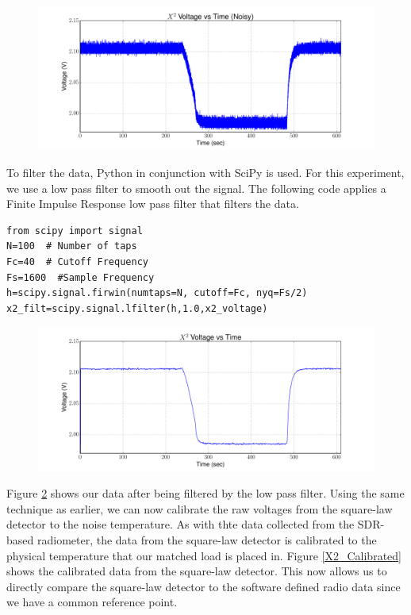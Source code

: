 \begin{figure}[h!tb] \centering
\includegraphics[width=\textwidth]{Experiments/Exp1/noisy_voltage.pdf}
\label{X2_Raw}
\end{figure}

To filter the data, Python in conjunction with SciPy is used.  For this experiment, we use a low pass filter to smooth out the signal.  The following code applies a Finite Impulse Response low pass filter that filters the data.

\begin{lstlisting}[frame=single,keywordstyle=\color{blue}]
from scipy import signal
N=100  # Number of taps
Fc=40  # Cutoff Frequency
Fs=1600  #Sample Frequency
h=scipy.signal.firwin(numtaps=N, cutoff=Fc, nyq=Fs/2)
x2_filt=scipy.signal.lfilter(h,1.0,x2_voltage)
\end{lstlisting}

\begin{figure}[h!tb] \centering
\includegraphics[width=\textwidth]{Experiments/Exp1/x2_filter.pdf}
\label{X2_filter}
\end{figure}

Figure \ref{X2_filter} shows our data after being filtered by the low pass filter.  Using the same technique as earlier, we can now calibrate the raw voltages from the square-law detector to the noise temperature.  As with thte data collected from the SDR-based radiometer, the data from the square-law detector is calibrated to the physical temperature that our matched load is placed in.  Figure \ref{X2_Calibrated} shows the calibrated data from the square-law detector.  This now allows us to directly compare the square-law detector to the software defined radio data since we have a common reference point.

